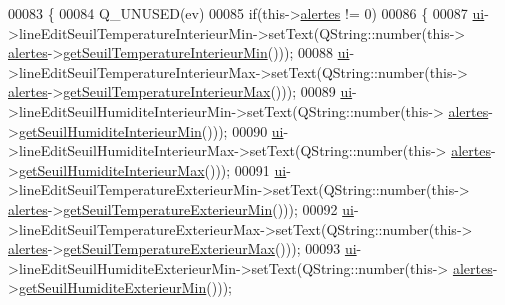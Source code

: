 \begin{DoxyCode}
00083 \{
00084     Q\_UNUSED(ev)
00085     \textcolor{keywordflow}{if}(this->\hyperlink{class_reglages_alertes_ihm_a9afa97e737d3c6a9a28a23fc4bc4beeb}{alertes} != 0)
00086     \{
00087         \hyperlink{class_reglages_alertes_ihm_af3a1fcc84fb1c76248b330372947b245}{ui}->lineEditSeuilTemperatureInterieurMin->setText(QString::number(this->
      \hyperlink{class_reglages_alertes_ihm_a9afa97e737d3c6a9a28a23fc4bc4beeb}{alertes}->\hyperlink{class_alertes_af61b11556d97f923cf7dd25ac4f5dd05}{getSeuilTemperatureInterieurMin}()));
00088         \hyperlink{class_reglages_alertes_ihm_af3a1fcc84fb1c76248b330372947b245}{ui}->lineEditSeuilTemperatureInterieurMax->setText(QString::number(this->
      \hyperlink{class_reglages_alertes_ihm_a9afa97e737d3c6a9a28a23fc4bc4beeb}{alertes}->\hyperlink{class_alertes_ac514ebef5e7e65aa7bee0ebe3cd7e883}{getSeuilTemperatureInterieurMax}()));
00089         \hyperlink{class_reglages_alertes_ihm_af3a1fcc84fb1c76248b330372947b245}{ui}->lineEditSeuilHumiditeInterieurMin->setText(QString::number(this->
      \hyperlink{class_reglages_alertes_ihm_a9afa97e737d3c6a9a28a23fc4bc4beeb}{alertes}->\hyperlink{class_alertes_a40d47b65952035b78cac05b915ad57b8}{getSeuilHumiditeInterieurMin}()));
00090         \hyperlink{class_reglages_alertes_ihm_af3a1fcc84fb1c76248b330372947b245}{ui}->lineEditSeuilHumiditeInterieurMax->setText(QString::number(this->
      \hyperlink{class_reglages_alertes_ihm_a9afa97e737d3c6a9a28a23fc4bc4beeb}{alertes}->\hyperlink{class_alertes_a86e0bb83ac1fa5e704e3b7b3fc7147cd}{getSeuilHumiditeInterieurMax}()));
00091         \hyperlink{class_reglages_alertes_ihm_af3a1fcc84fb1c76248b330372947b245}{ui}->lineEditSeuilTemperatureExterieurMin->setText(QString::number(this->
      \hyperlink{class_reglages_alertes_ihm_a9afa97e737d3c6a9a28a23fc4bc4beeb}{alertes}->\hyperlink{class_alertes_a4451c6b077256d838e584a073444d83d}{getSeuilTemperatureExterieurMin}()));
00092         \hyperlink{class_reglages_alertes_ihm_af3a1fcc84fb1c76248b330372947b245}{ui}->lineEditSeuilTemperatureExterieurMax->setText(QString::number(this->
      \hyperlink{class_reglages_alertes_ihm_a9afa97e737d3c6a9a28a23fc4bc4beeb}{alertes}->\hyperlink{class_alertes_a00d834877e1fc34d7e0659ef6963ac4f}{getSeuilTemperatureExterieurMax}()));
00093         \hyperlink{class_reglages_alertes_ihm_af3a1fcc84fb1c76248b330372947b245}{ui}->lineEditSeuilHumiditeExterieurMin->setText(QString::number(this->
      \hyperlink{class_reglages_alertes_ihm_a9afa97e737d3c6a9a28a23fc4bc4beeb}{alertes}->\hyperlink{class_alertes_a68e467e042b615f56347a0953d6e64f1}{getSeuilHumiditeExterieurMin}()));

\end{DoxyCode}
